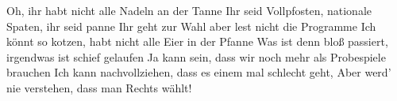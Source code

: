 \begin{guitar}
	Oh, ihr habt nicht alle Nadeln an der Tanne
	Ihr seid Vollpfosten, nationale Spaten, ihr seid panne
	Ihr geht zur Wahl aber lest nicht die Programme
	Ich könnt so kotzen, habt nicht alle Eier in der Pfanne
	Was ist denn bloß passiert, irgendwas ist schief gelaufen
	Ja kann sein, dass wir noch mehr als Probespiele brauchen
	Ich kann nachvollziehen, dass es einem mal schlecht geht, 
	Aber werd' nie verstehen, dass man Rechts wählt!
	
	 
\end{guitar}